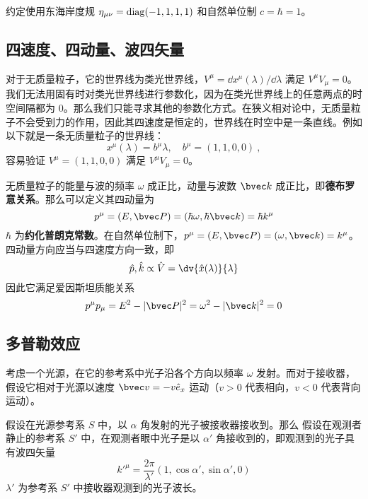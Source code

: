 

约定使用东海岸度规 $\eta_{\mu\nu}=\rm{diag}(-1,1,1,1)$ 和自然单位制 $c=\hbar=1$。
\subsection{四速度、四动量、波四矢量}
对于无质量粒子，它的世界线为类光世界线，$V^\mu=\dd x^\mu(\lambda)/\dd \lambda$ 满足 $V^\mu V_\mu = 0$。我们无法用固有时对类光世界线进行参数化，因为在类光世界线上的任意两点的时空间隔都为 $0$。那么我们只能寻求其他的参数化方式。在狭义相对论中，无质量粒子不会受到力的作用，因此其四速度是恒定的，世界线在时空中是一条直线。例如以下就是一条无质量粒子的世界线：
\begin{equation}
x^\mu(\lambda)=b^\mu \lambda,\quad b^\mu=(1,1,0,0)~,
\end{equation}
容易验证 $V^\mu=(1,1,0,0)$ 满足 $V^\mu V_\mu = 0$。

无质量粒子的能量与波的频率 $\omega$ 成正比，动量与波数 $\bvec k$ 成正比，即\textbf{德布罗意关系}。那么可以定义其四动量为
\begin{equation}
p^\mu=(E,\bvec P)=(\hbar \omega,\hbar \bvec k)=\hbar k^\mu
\end{equation}
$\hbar$ 为\textbf{约化普朗克常数}。在自然单位制下，$p^\mu=(E,\bvec P)=(\omega,\bvec k)=k^\mu$。四动量方向应当与四速度方向一致，即
\begin{equation}
\hat p,\hat k \propto \hat V=\dv{\hat x(\lambda)}{\lambda}
\end{equation}
因此它满足爱因斯坦质能关系
\begin{equation}
p^\mu p_\mu = E^2-|\bvec P|^2=\omega^2-|\bvec k|^2=0
\end{equation}
\subsection{多普勒效应}
考虑一个光源，在它的参考系中光子沿各个方向以频率 $\omega$ 发射。而对于接收器，假设它相对于光源以速度 $\bvec v=-v \hat e_x$ 运动（$v>0$ 代表相向，$v<0$ 代表背向运动）。

假设在光源参考系 $S$ 中，以 $\alpha$ 角发射的光子被接收器接收到。那么
假设在观测者静止的参考系 $S'$ 中，在观测者眼中光子是以 $\alpha'$ 角接收到的，即观测到的光子具有波四矢量
\begin{equation}
k'^\mu = \frac{2\pi}{\lambda'}(1,\cos\alpha',\sin\alpha',0)
\end{equation}
$\lambda'$ 为参考系 $S'$ 中接收器观测到的光子波长。

